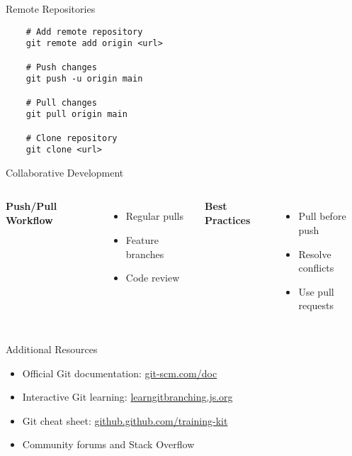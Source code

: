 \documentclass[10pt]{beamer}
\begin{document}
\begin{frame}[fragile]{Remote Repositories}
    \begin{verbatim}
    # Add remote repository
    git remote add origin <url>
    
    # Push changes
    git push -u origin main
    
    # Pull changes
    git pull origin main
    
    # Clone repository
    git clone <url>
    \end{verbatim}
\end{frame}

\begin{frame}{Collaborative Development}
    \begin{columns}
        \textbf{Push/Pull Workflow}
        \begin{itemize}
            \item Regular pulls
            \item Feature branches
            \item Code review
        \end{itemize}
        
        \textbf{Best Practices}
        \begin{itemize}
            \item Pull before push
            \item Resolve conflicts
            \item Use pull requests
        \end{itemize}
    \end{columns}
\end{frame}

\begin{frame}{Additional Resources}
    \begin{itemize}
        \item Official Git documentation: \url{git-scm.com/doc}
        \item Interactive Git learning: \url{learngitbranching.js.org}
        \item Git cheat sheet: \url{github.github.com/training-kit}
        \item Community forums and Stack Overflow
    \end{itemize}
\end{frame}
\end{document}
